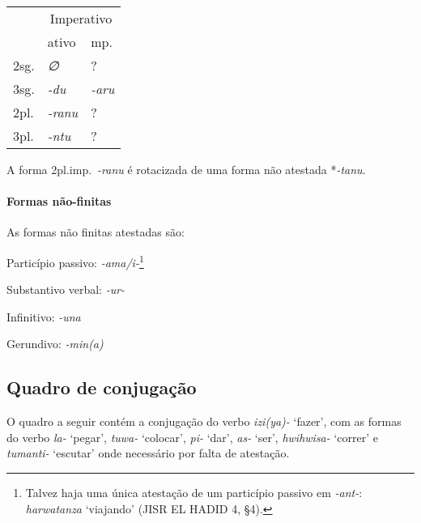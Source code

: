 \begin{center}
	\begin{tabular}[c]{lll}
		\toprule
		     & \multicolumn{2}{c}{Imperativo}               \\
		     & ativo                          & mp.         \\
		\midrule
		2sg. & \emph{∅}                       & {?}         \\
		3sg. & \emph{-du}                     & \emph{-aru} \\
		\midrule
		2pl. & \emph{-ranu}                   & {?}         \\
		3pl. & \emph{-ntu}                    & {?}         \\
		\bottomrule
	\end{tabular}
\end{center}

\noindent A forma 2pl.imp.\ \emph{-ranu} é rotacizada de uma forma não atestada
*\emph{-tanu}.

\paragraph{Formas não-finitas}
As formas não finitas atestadas são:

\begin{compactitem}
	\item Particípio passivo: \emph{-ama\slash{}i-}\footnote{Talvez haja uma única
		atestação de um particípio passivo em \emph{-ant-}: \emph{harwatanza}
		`viajando' (JISR EL HADID 4, §4).}
	\item Substantivo verbal: \emph{-ur-}
	\item Infinitivo: \emph{-una}
	\item Gerundivo: \emph{-min{(a)}}
\end{compactitem}



\subsection{Quadro de conjugação}

O quadro a seguir contém a conjugação do verbo \emph{izi{(ya)}-} `fazer', com as
formas do verbo \emph{la-} `pegar', \emph{tuwa-} `colocar', \emph{pi-} `dar',
\emph{as-} `ser', \emph{hwihwisa-}
`correr' e \emph{tumanti-} `escutar' onde necessário por falta de atestação.

